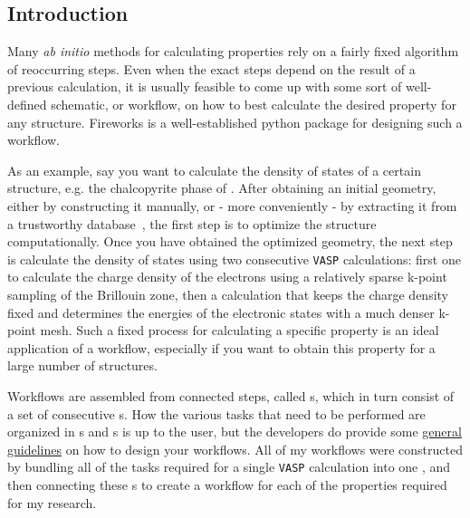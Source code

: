 \begin{refsection}
\pagebreak

\section{Introduction} \label{automation:sec-intro}

Many \textit{ab initio} methods for calculating properties rely on a fairly fixed algorithm of reoccurring steps. Even when the exact steps depend on the result of a previous calculation, it is usually feasible to come up with some sort of well-defined schematic, or workflow, on how to best calculate the desired property for any structure. Fireworks is a well-established python package for designing such a workflow.

As an example, say you want to calculate the density of states of a certain structure, e.g. the chalcopyrite phase of . After obtaining an initial geometry, either by constructing it manually, or - more conveniently - by extracting it from a trustworthy database~\cite{Jain2013}, the first step is to optimize the structure computationally. Once you have obtained the optimized geometry, the next step is calculate the density of states using two consecutive \texttt{VASP} calculations: first one to calculate the charge density of the electrons using a relatively sparse k-point sampling of the Brillouin zone, then a calculation that keeps the charge density fixed and determines the energies of the electronic states with a much denser k-point mesh. Such a fixed process for calculating a specific property is an ideal application of a workflow, especially if you want to obtain this property for a large number of structures. 

Workflows are assembled from connected steps, called \href{https://github.com/materialsproject/fireworks/blob/master/fireworks/core/firework.py#L196}{}s, which in turn consist of a set of consecutive \href{https://github.com/materialsproject/fireworks/blob/master/fireworks/core/firework.py#L46}{}s. How the various tasks that need to be performed are organized in s and s is up to the user, but the developers do provide some \href{https://materialsproject.github.io/fireworks/design_tips.html}{general guidelines} on how to design your workflows. All of my workflows were constructed by bundling all of the tasks required for a single \texttt{VASP} calculation into one , and then connecting these s to create a workflow for each of the properties required for my research.


\end{refsection}
